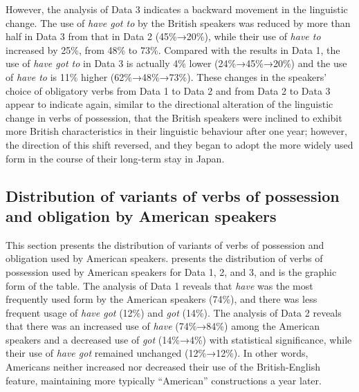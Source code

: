 \documentclass[output=paper,colorlinks,citecolor=brown]{langscibook}
\begin{document}
However, the analysis of Data 3 indicates a backward movement in the linguistic change. The use of \textit{have got to} by the British speakers was reduced by more than half in Data 3 from that in Data 2 (45\%→20\%), while their use of \textit{have to} increased by 25\%, from 48\% to 73\%. Compared with the results in Data 1, the use of \textit{have got to} in Data 3 is actually 4\% lower (24\%→45\%→20\%) and the use of \textit{have to} is 11\% higher (62\%→48\%→73\%). These changes in the speakers’ choice of obligatory verbs from Data 1 to Data 2 and from Data 2 to Data 3 appear to indicate again, similar to the directional alteration of the linguistic change in verbs of possession, that the British speakers were inclined to exhibit more British characteristics in their linguistic behaviour after one year; however, the direction of this shift reversed, and they began to adopt the more widely used form in the course of their long-term stay in Japan.


\subsection{Distribution of variants of verbs of possession and obligation by American speakers}
\label{sec:hirano:5.2}

This section presents the distribution of variants of verbs of possession and obligation used by American speakers.   presents the distribution of verbs of possession used by American speakers for Data 1, 2, and 3, and   is the graphic form of the table. The analysis of Data 1 reveals that \textit{have} was the most frequently used form by the American speakers (74\%), and there was less frequent usage of \textit{have got} (12\%) and \textit{got} (14\%). The analysis of Data 2 reveals that there was an increased use of \textit{have} (74\%→84\%) among the American speakers and a decreased use of \textit{got} (14\%→4\%) with statistical significance, while their use of \textit{have got} remained unchanged (12\%→12\%). In other words, Americans neither increased nor decreased their use of the British-English feature, maintaining more typically “American” constructions a year later.
\end{document}
